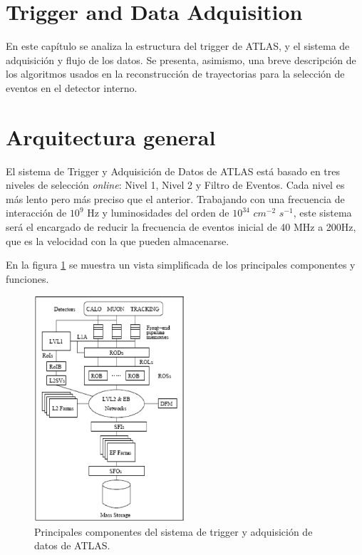 \section{Trigger and Data Adquisition}\label{sec:atlasCALO}
 En este cap\'itulo se analiza la estructura del trigger de ATLAS, y el sistema de adquisici\'on y flujo de los datos. Se presenta, asimismo, una breve descripci\'on de los algoritmos usados en la reconstrucci\'on de trayectorias para la selecci\'on de eventos en el detector interno. 


\section{Arquitectura general}

   El sistema de Trigger y Adquisici\'on de Datos\cite{TDRtdaq} de ATLAS est\'a basado en tres niveles de selecci\'on \emph{online}: Nivel 1, Nivel 2 y Filtro de Eventos. Cada nivel es m\'as lento pero m\'as preciso que el anterior. Trabajando con una frecuencia de interacci\'on de $10^{9}$ Hz y luminosidades del orden de $10^{34}$ $cm^{-2}$ $s^{-1}$, este sistema ser\'a el encargado de reducir la frecuencia de eventos inicial de 40 MHz a 200Hz, que es la velocidad con la que pueden almacenarse. 

   En la figura \ref{fig:TDAQ} se muestra un vista simplificada de los principales componentes y funciones.  

\begin{figure}[!h]
\begin{center}
\includegraphics[width=0.5\textwidth]{Fig3/paint_TDAQ.eps}
\caption{Principales componentes del sistema de trigger y adquisici\'on de datos de ATLAS. } 
\label{fig:TDAQ}
\end{center}
\end{figure}

